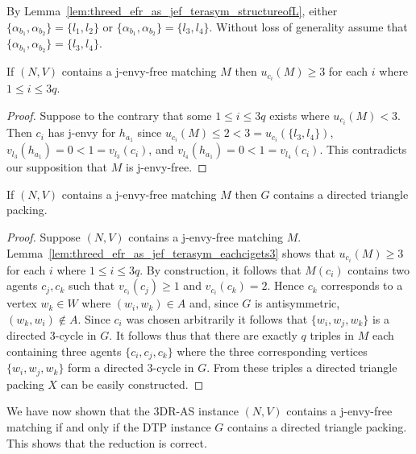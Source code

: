 By Lemma~\ref{lem:threed_efr_as_jef_terasym_structureofL}, either $\{ \alpha_{b_1}, \alpha_{b_2} \} = \{ l_1, l_2 \}$ or $\{ \alpha_{b_1}, \alpha_{b_2} \} = \{ l_3, l_4 \}$. Without loss of generality assume that $\{ \alpha_{b_1}, \alpha_{b_2} \} = \{ l_3, l_4 \}$.

\begin{lem}
\label{lem:threed_efr_as_jef_terasym_eachcigets3}
If $(N, V)$ contains a j-envy-free matching $M$ then $u_{c_i}(M) \geq 3$ for each $i$ where $1\leq i \leq 3q$.
\end{lem}
\begin{proof}
Suppose to the contrary that some $1\leq i \leq 3q$ exists where $u_{c_i}(M) < 3$. Then $c_i$ has j-envy for $h_{a_1}$ since $u_{c_i}(M) \leq 2 < 3 = u_{c_i}(\{ l_3, l_4 \})$, $v_{l_3}(h_{a_1}) = 0 < 1 = v_{l_3}(c_i)$, and $v_{l_4}(h_{a_1}) = 0 < 1 = v_{l_4}(c_i)$. This contradicts our supposition that $M$ is j-envy-free.
\end{proof}

\begin{lem}
\label{lem:threed_efr_as_jef_terasym_second_direction}
If $(N, V)$ contains a j-envy-free matching $M$ then $G$ contains a directed triangle packing.
\end{lem}
\begin{proof}
Suppose $(N, V)$ contains a j-envy-free matching $M$. Lemma~\ref{lem:threed_efr_as_jef_terasym_eachcigets3} shows that $u_{c_i}(M) \geq 3$ for each $i$ where $1\leq i \leq 3q$. By construction, it follows that $M(c_i)$ contains two agents $c_j, c_k$ such that $v_{c_i}(c_j) \geq 1$ and $v_{c_i}(c_k) = 2$. Hence $c_k$ corresponds to a vertex $w_k \in W$ where $( w_i, w_k ) \in A$ and, since $G$ is antisymmetric, $( w_k, w_i ) \notin A$. Since $c_i$ was chosen arbitrarily it follows that $\{ w_i, w_j, w_k \}$ is a directed $3$-cycle in $G$. It follows thus that there are exactly $q$ triples in $M$ each containing three agents $\{ c_i, c_j, c_k \}$ where the three corresponding vertices $\{ w_i, w_j, w_k \}$ form a directed $3$-cycle in $G$. From these triples a directed triangle packing $X$ can be easily constructed.
\end{proof}


We have now shown that the 3DR-AS instance $(N, V)$ contains a j-envy-free matching if and only if the DTP instance $G$ contains a directed triangle packing. This shows that the reduction is correct.

